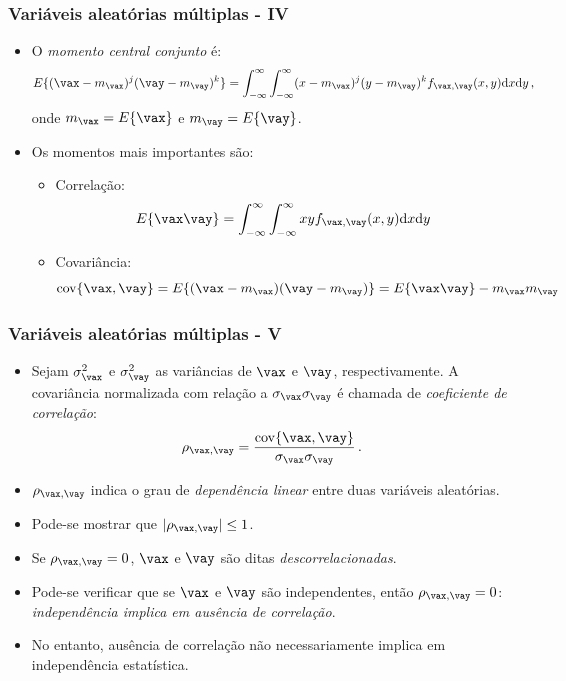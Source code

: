 \begin{frame}
    \frametitle{Variáveis aleatórias múltiplas - IV}

    \begin{itemize}
     \item O \textit{momento central conjunto} é:
      \begin{equation}
	  E\{(\vax-m_{\vax})^j(\vay-m_{\vay})^k\} = \int_{-\infty}^{\infty}\int_{-\infty}^{\infty} (x-m_{\vax})^j (y-m_{\vay})^k f_{\vax,\vay}(x,y)\mathrm{d}x\mathrm{d}y \, ,
      \end{equation}
      onde $m_{\vax} = E\{\vax\}$ e $m_{\vay} = E\{\vay\}$.
      \item Os momentos mais importantes são:
      \begin{itemize}
       \item Correlação:
	\begin{equation}
	    E\{\vax\vay\} = \int_{-\infty}^{\infty}\int_{-\infty}^{\infty} x y f_{\vax,\vay}(x,y)\mathrm{d}x\mathrm{d}y
	\end{equation}
	\item Covariância:
	\begin{equation}
	    \mathrm{cov}\{\vax,\vay\} = E\{(\vax-m_{\vax})(\vay-m_{\vay})\} = E\{\vax\vay\} - m_{\vax}m_{\vay}
	\end{equation}

      \end{itemize}

    \end{itemize}
    
\end{frame}

\begin{frame}
    \frametitle{Variáveis aleatórias múltiplas - V}

    \begin{itemize}
     \item Sejam $\sigma_{\vax}^2$ e $\sigma_{\vay}^2$ as variâncias de $\vax$ e $\vay$, respectivamente. A covariância normalizada com relação a $\sigma_{\vax}\sigma_{\vay}$ é chamada de \textit{coeficiente de correlação}:
      \begin{equation}
	  \rho_{\vax,\vay} = \frac{\mathrm{cov}\{\vax,\vay\}}{\sigma_{\vax}\sigma_{\vay}} \, .
      \end{equation}
    \item $\rho_{\vax,\vay}$ indica o grau de \textit{dependência linear} entre duas variáveis aleatórias. 
    \item Pode-se mostrar que $|\rho_{\vax,\vay}| \leq 1$.
    \item Se $\rho_{\vax,\vay} = 0$, $\vax$ e $\vay$ são ditas \textit{descorrelacionadas}.
    \item Pode-se verificar que se $\vax$ e $\vay$ são independentes, então $\rho_{\vax,\vay} = 0$: \textit{independência implica em ausência de correlação}.
    \item No entanto, ausência de correlação não necessariamente implica em independência estatística.
    \end{itemize}
    
\end{frame}

